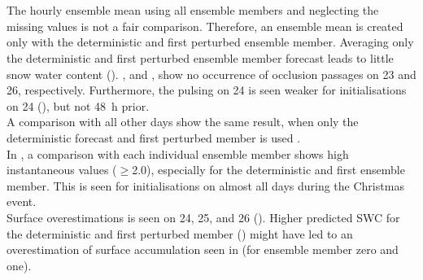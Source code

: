 \noindent
\\
\\
The hourly ensemble mean using all ensemble members and neglecting the missing values is not a fair comparison. Therefore, an ensemble mean is created only with the deterministic and first perturbed ensemble member. Averaging only the deterministic and first perturbed ensemble member forecast leads to little snow water content (). ,  and ,  show no occurrence of occlusion passages on \num{23} and \SI{26}{\dec}, respectively. Furthermore, the pulsing on \SI{24}{\dec} is seen weaker for initialisations on \SI{24}{\dec} (), but not \SI{48}{\hour} prior.
\\
A comparison with all other days show the same result, when only the deterministic forecast and first perturbed member is used . 
\\
In , a comparison with each individual ensemble member shows high instantaneous values ($\ge$\SI{2.0}{\SWC}), especially for the deterministic and first ensemble member. This is seen for initialisations on almost all days during the Christmas event. 
\\
Surface overestimations is seen on \num{24}, \num{25}, and \SI{26}{\dec} (). Higher predicted SWC for the deterministic and first perturbed member () might have led to an overestimation of surface accumulation seen in  (for ensemble member zero and one).
